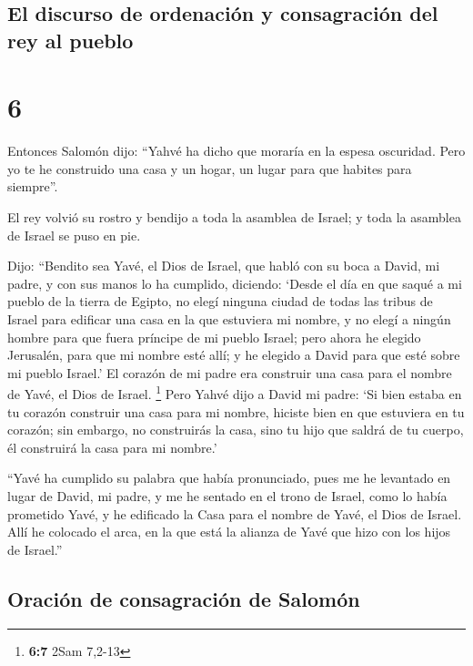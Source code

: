 \hypertarget{el-discurso-de-ordenaciuxf3n-y-consagraciuxf3n-del-rey-al-pueblo}{%
\subsection{El discurso de ordenación y consagración del rey al
pueblo}\label{el-discurso-de-ordenaciuxf3n-y-consagraciuxf3n-del-rey-al-pueblo}}

\hypertarget{section-5}{%
\section{6}\label{section-5}}

 Entonces Salomón dijo: ``Yahvé ha dicho que moraría en la
espesa oscuridad.  Pero yo te he construido una casa y un
hogar, un lugar para que habites para siempre''.

 El rey volvió su rostro y bendijo a toda la asamblea de
Israel; y toda la asamblea de Israel se puso en pie.

 Dijo: ``Bendito sea Yavé, el Dios de Israel, que habló
con su boca a David, mi padre, y con sus manos lo ha cumplido, diciendo:
 `Desde el día en que saqué a mi pueblo de la tierra de
Egipto, no elegí ninguna ciudad de todas las tribus de Israel para
edificar una casa en la que estuviera mi nombre, y no elegí a ningún
hombre para que fuera príncipe de mi pueblo Israel;  pero
ahora he elegido Jerusalén, para que mi nombre esté allí; y he elegido a
David para que esté sobre mi pueblo Israel.'  El corazón
de mi padre era construir una casa para el nombre de Yavé, el Dios de
Israel. \footnote{\textbf{6:7} 2Sam 7,2-13}  Pero Yahvé
dijo a David mi padre: `Si bien estaba en tu corazón construir una casa
para mi nombre, hiciste bien en que estuviera en tu corazón;
 sin embargo, no construirás la casa, sino tu hijo que
saldrá de tu cuerpo, él construirá la casa para mi nombre.'

 ``Yavé ha cumplido su palabra que había pronunciado,
pues me he levantado en lugar de David, mi padre, y me he sentado en el
trono de Israel, como lo había prometido Yavé, y he edificado la Casa
para el nombre de Yavé, el Dios de Israel.  Allí he
colocado el arca, en la que está la alianza de Yavé que hizo con los
hijos de Israel.''

\hypertarget{oraciuxf3n-de-consagraciuxf3n-de-salomuxf3n}{%
\subsection{Oración de consagración de
Salomón}\label{oraciuxf3n-de-consagraciuxf3n-de-salomuxf3n}}

